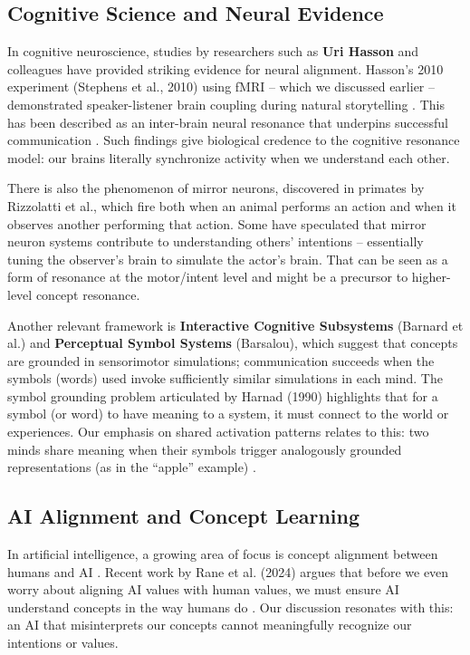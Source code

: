 \documentclass{article}
\begin{document}
\subsection{Cognitive Science and Neural Evidence}

In cognitive neuroscience, studies by researchers such as \textbf{Uri Hasson} and colleagues have provided striking evidence for neural alignment. Hasson's 2010 experiment (Stephens et al., 2010) using fMRI -- which we discussed earlier -- demonstrated speaker-listener brain coupling during natural storytelling \citep{stephens2010}. This has been described as an inter-brain neural resonance that underpins successful communication \citep{stephens2010}. Such findings give biological credence to the cognitive resonance model: our brains literally synchronize activity when we understand each other.

There is also the phenomenon of mirror neurons, discovered in primates by Rizzolatti et al., which fire both when an animal performs an action and when it observes another performing that action. Some have speculated that mirror neuron systems contribute to understanding others' intentions -- essentially tuning the observer's brain to simulate the actor's brain. That can be seen as a form of resonance at the motor/intent level and might be a precursor to higher-level concept resonance.

Another relevant framework is \textbf{Interactive Cognitive Subsystems} (Barnard et al.) and \textbf{Perceptual Symbol Systems} (Barsalou), which suggest that concepts are grounded in sensorimotor simulations; communication succeeds when the symbols (words) used invoke sufficiently similar simulations in each mind. The symbol grounding problem \citep{harnad1990} articulated by Harnad (1990) highlights that for a symbol (or word) to have meaning to a system, it must connect to the world or experiences. Our emphasis on shared activation patterns relates to this: two minds share meaning when their symbols trigger analogously grounded representations (as in the ``apple'' example) \citep{rane2024}.

\subsection{AI Alignment and Concept Learning}

In artificial intelligence, a growing area of focus is concept alignment between humans and AI \citep{rane2024}. Recent work by Rane et al. (2024) argues that before we even worry about aligning AI values with human values, we must ensure AI understand concepts in the way humans do \citep{rane2024}. Our discussion resonates with this: an AI that misinterprets our concepts cannot meaningfully recognize our intentions or values.
\end{document}
